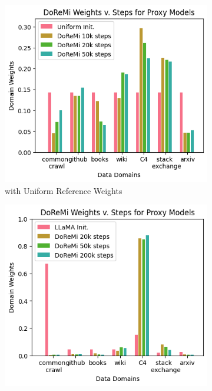 \documentclass{article} %
\begin{document}
\begin{appendices}{}
\begin{figure}[h!]
    \centering
    \begin{subfigure}[b]{0.45\textwidth}
        \includegraphics[width=\textwidth]{gptfigs/doremiUni.png}
        \caption{with Uniform Reference Weights}
    \end{subfigure}
    \hspace{1em}
    \begin{subfigure}[b]{0.45\textwidth}
        \includegraphics[width=\textwidth]{gptfigs/doremiLM.png}

\end{subfigure}
\end{figure}
\end{appendices}
\end{document}
